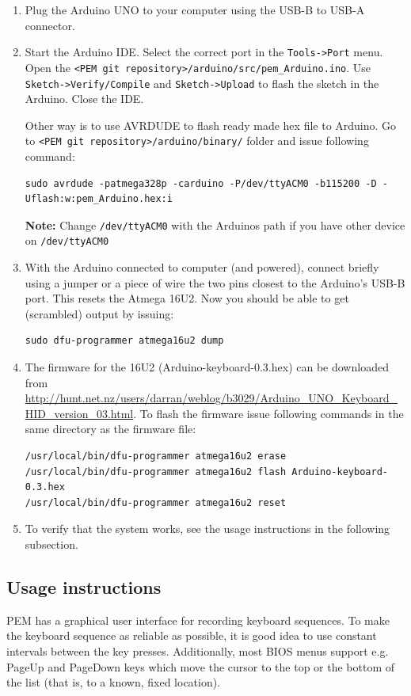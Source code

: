 \documentclass[a4paper,11pt]{article}
\newcommand{\note}{\textbf{Note: }}
\newcommand{\cmd}[1]{\texttt{#1}}
\begin{document}
\begin{enumerate}
\item Plug the Arduino UNO to your computer using the USB-B to USB-A connector.

\item Start the Arduino IDE. Select the correct port in the \cmd{Tools->Port} menu. Open the \cmd{<PEM git repository>/arduino/src/pem\_Arduino.ino}. Use \cmd{Sketch->Verify/Compile} and \cmd{Sketch->Upload} to flash the sketch in the Arduino. Close the IDE.

Other way is to use AVRDUDE to flash ready made hex file to Arduino. Go to \cmd{<PEM git repository>/arduino/binary/} folder and issue following command:
\begin{lstlisting}
sudo avrdude -patmega328p -carduino -P/dev/ttyACM0 -b115200 -D -Uflash:w:pem_Arduino.hex:i
\end{lstlisting}
\note Change \cmd{/dev/ttyACM0} with the Arduinos path if you have other device on \cmd{/dev/ttyACM0}

\item With the Arduino connected to computer (and powered), connect briefly using a jumper or a piece of wire the two pins closest to the Arduino's USB-B port. This resets the Atmega 16U2. Now you should be able to get (scrambled) output by issuing:
\begin{lstlisting}
sudo dfu-programmer atmega16u2 dump
\end{lstlisting}

\item The firmware for the 16U2 (Arduino-keyboard-0.3.hex) can be downloaded from \url{http://hunt.net.nz/users/darran/weblog/b3029/Arduino_UNO_Keyboard_HID_version_03.html}. To flash the firmware issue following commands in the same directory as the firmware file:
\begin{lstlisting}
/usr/local/bin/dfu-programmer atmega16u2 erase
/usr/local/bin/dfu-programmer atmega16u2 flash Arduino-keyboard-0.3.hex
/usr/local/bin/dfu-programmer atmega16u2 reset
\end{lstlisting}

\item To verify that the system works, see the usage instructions in the following subsection.
\end{enumerate}

\subsection{Usage instructions}
PEM has a graphical user interface for recording keyboard sequences. To make the keyboard sequence as reliable as possible, it is good idea to use constant intervals between the key presses. Additionally, most BIOS menus support e.g. PageUp and PageDown keys which move the cursor to the top or the bottom of the list (that is, to a known, fixed location).
\end{document}
